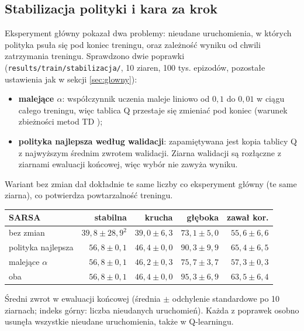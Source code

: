 \documentclass[11pt,a4paper]{article}
\begin{document}
\subsection{Stabilizacja polityki i kara za krok}\label{sec:stabil}
Eksperyment główny pokazał dwa problemy: nieudane uruchomienia, w których polityka
psuła się pod koniec treningu, oraz zależność wyniku od chwili zatrzymania treningu.
Sprawdzono dwie poprawki (\texttt{results/train/stabilizacja/}, 10 ziaren, 100 tys.
epizodów, pozostałe ustawienia jak w sekcji \ref{sec:glowny}):
\begin{itemize}
  \item \textbf{malejące $\alpha$}: współczynnik uczenia maleje liniowo od $0{,}1$
  do $0{,}01$ w ciągu całego treningu, więc tablica Q przestaje się zmieniać pod
  koniec (warunek zbieżności metod TD \cite{sutton});
  \item \textbf{polityka najlepsza według walidacji}: zapamiętywana jest kopia
  tablicy Q z najwyższym średnim zwrotem walidacji. Ziarna walidacji są rozłączne
  z ziarnami ewaluacji końcowej, więc wybór nie zawyża wyniku.
\end{itemize}
Wariant bez zmian dał dokładnie te same liczby co eksperyment główny (te same
ziarna), co potwierdza powtarzalność treningu.

\begin{center}
\small
\begin{tabular}{@{}lrrrr@{}}
\toprule
SARSA & stabilna & krucha & głęboka & zawał kor. \\
\midrule
bez zmian & $39{,}8 \pm 28{,}9^{2}$ & $39{,}0 \pm 6{,}3$ & $73{,}1 \pm 5{,}0$ & $55{,}6 \pm 6{,}6$ \\
polityka najlepsza & $56{,}8 \pm 0{,}1$ & $46{,}4 \pm 0{,}0$ & $90{,}3 \pm 9{,}9$ & $65{,}4 \pm 6{,}5$ \\
malejące $\alpha$ & $56{,}8 \pm 0{,}1$ & $46{,}2 \pm 0{,}3$ & $75{,}7 \pm 3{,}7$ & $57{,}3 \pm 0{,}3$ \\
oba & $56{,}8 \pm 0{,}1$ & $46{,}4 \pm 0{,}0$ & $95{,}3 \pm 6{,}9$ & $63{,}5 \pm 6{,}4$ \\
\bottomrule
\end{tabular}
\end{center}
Średni zwrot w ewaluacji końcowej (średnia $\pm$ odchylenie standardowe po 10
ziarnach; indeks górny: liczba nieudanych uruchomień). Każda z poprawek osobno
usunęła wszystkie nieudane uruchomienia, także w Q-learningu.
\end{document}
